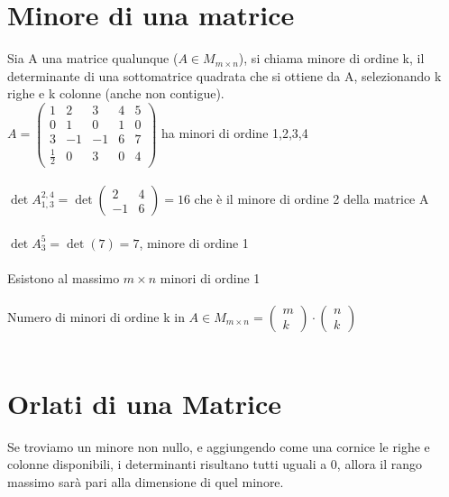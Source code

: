 \section{Minore di una matrice}
Sia A una matrice qualunque ($A\in M_{m\times n}$), si chiama minore di ordine k, il determinante di una sottomatrice quadrata che si ottiene da A, selezionando k righe e k colonne (anche non contigue).\\
$A=\begin{pmatrix}
	1 & 2 & 3 & 4 & 5\\
	0 & 1 & 0 & 1 & 0\\
	3 & -1 & -1 & 6 & 7\\
	\frac{1}{2} & 0 & 3 & 0 & 4
\end{pmatrix}$ ha minori di ordine 1,2,3,4\leavevmode\\\\
$\det A^{2,4}_{1,3}=\det\begin{pmatrix}
	2 & 4\\
	-1 & 6
\end{pmatrix}=16$ che è il minore di ordine 2 della matrice A\leavevmode\\\\
$\det A^{5}_{3}=\det(7)=7$, minore di ordine 1\leavevmode\\\\
Esistono al massimo $m\times n$ minori di ordine 1\leavevmode\\\\
Numero di minori di ordine k in $A\in M_{m\times n}=\begin{pmatrix}
	m\\
	k
\end{pmatrix}\cdot\begin{pmatrix}
	n\\
	k
\end{pmatrix}$
\leavevmode\\\\
\section{Orlati di una Matrice}

Se troviamo un minore non nullo, e aggiungendo come una cornice le righe e colonne disponibili, i determinanti risultano tutti uguali a 0, allora il rango massimo sarà pari alla dimensione di quel minore.

